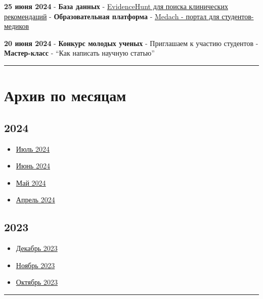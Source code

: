 \documentclass[
  russian,
  letterpaper,
]{book}
\providecommand{\tightlist}{%
  \setlength{\itemsep}{0pt}\setlength{\parskip}{0pt}}
\begin{document}
\textbf{25 июня 2024} - \textbf{База данных} -
\href{https://evidencehunt.com}{EvidenceHunt для поиска клинических
рекомендаций} - \textbf{Образовательная платформа} -
\href{https://medach.pro}{Medach - портал для студентов-медиков}

\textbf{20 июня 2024} - \textbf{Конкурс молодых ученых} - Приглашаем к
участию студентов - \textbf{Мастер-класс} - ``Как написать научную
статью''

\begin{center}\rule{0.5\linewidth}{0.5pt}\end{center}

\section{Архив по
месяцам}\label{ux430ux440ux445ux438ux432-ux43fux43e-ux43cux435ux441ux44fux446ux430ux43c}

\subsection{2024}\label{section}

\begin{itemize}
\tightlist
\item
  \hyperref[ux438ux44eux43bux44c-2024]{Июль 2024}
\item
  \hyperref[ux438ux44eux43dux44c-2024]{Июнь 2024}
\item
  \hyperref[ux43cux430ux439-2024]{Май 2024}
\item
  \hyperref[ux430ux43fux440ux435ux43bux44c-2024]{Апрель 2024}
\end{itemize}

\subsection{2023}\label{section-1}

\begin{itemize}
\tightlist
\item
  \hyperref[ux434ux435ux43aux430ux431ux440ux44c-2023]{Декабрь 2023}
\item
  \hyperref[ux43dux43eux44fux431ux440ux44c-2023]{Ноябрь 2023}
\item
  \hyperref[ux43eux43aux442ux44fux431ux440ux44c-2023]{Октябрь 2023}
\end{itemize}

\begin{center}\rule{0.5\linewidth}{0.5pt}\end{center}
\end{document}
